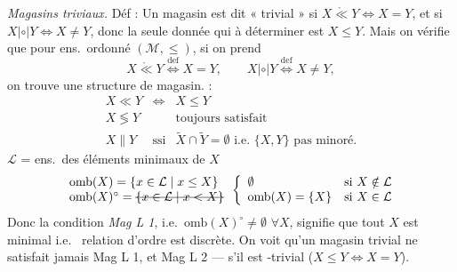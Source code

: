 \documentclass[11pt,a4paper]{article}
\begin{document}
\emph{Magasins triviaux.} Déf : Un magasin est dit « trivial » si
$X \mathrel{\mathring{\ll}} Y \Leftrightarrow X = Y$, et si
$X \mathrel{|\circ|} Y \Leftrightarrow X \neq Y$, donc la seule donnée qui
 à déterminer est $X \leq Y$. Mais on vérifie 
que pour  ens.\ ordonné $(\mathcal{M}, \leq)$, si on prend
\[
  X \mathrel{\mathring{\ll}} Y \overset{\mathrm{def}}{\Longleftrightarrow} X = Y ,
  \qquad X \mathrel{|\circ|} Y \overset{\mathrm{def}}{\Longleftrightarrow} X \neq Y ,
\]
on trouve  une structure de magasin.
 \struck{\ill{}}  :
\[
  \begin{array}{lll}
    X \ll Y & \Longleftrightarrow & X \leq Y \\
    X \lessgtr Y & & \text{toujours satisfait} \\
    X \| Y & \text{ssi} & \widetilde{X} \cap \widetilde{Y} = \emptyset
      \text{ i.e. } \{X, Y\} \text{ pas minoré.}
  \end{array}
\]
$\mathcal{L}$ = ens.\ des éléments minimaux de $X$
\[
  \begin{array}{l}
    \mathrm{omb}(X) = \{ x \in \mathcal{L} \mid x \leq X \} \\
    \mathrm{omb}(X)^{\circ} = \text{\struck{$\{ x \in \mathcal{L} \mid x < X \}$}}
  \end{array}
  \left\{
  \begin{array}{ll}
    \emptyset & \text{si } X \notin \mathcal{L} \\
    \mathrm{omb}(X) = \{X\} & \text{si } X \in \mathcal{L}
  \end{array}
  \right.
\]
Donc la condition \emph{Mag L 1}, i.e.\ $\mathrm{omb}(X)^{\circ} \neq \emptyset$
$\forall X$, signifie que tout $X$ est minimal i.e.\  relation
d'ordre est discrète. On voit  qu'un magasin trivial ne satisfait
jamais Mag L 1, et   Mag L 2 --- 
s'il est -trivial ($X \leq Y \Leftrightarrow X = Y$).

\end{document}
